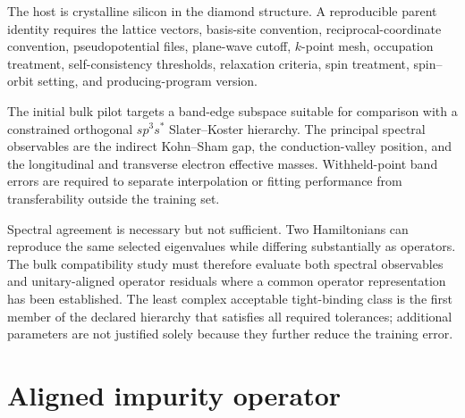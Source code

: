 The host is crystalline silicon in the diamond structure. A reproducible
parent identity requires the lattice vectors, basis-site convention,
reciprocal-coordinate convention, pseudopotential files, plane-wave cutoff,
$k$-point mesh, occupation treatment, self-consistency thresholds, relaxation
criteria, spin treatment, spin--orbit setting, and producing-program version.

The initial bulk pilot targets a band-edge subspace suitable for comparison
with a constrained orthogonal $sp^3s^{\ast}$ Slater--Koster hierarchy. The
principal spectral observables are the indirect Kohn--Sham gap, the
conduction-valley position, and the longitudinal and transverse electron
effective masses. Withheld-point band errors are required to separate
interpolation or fitting performance from transferability outside the training
set.

Spectral agreement is necessary but not sufficient. Two Hamiltonians can
reproduce the same selected eigenvalues while differing substantially as
operators. The bulk compatibility study must therefore evaluate both spectral
observables and unitary-aligned operator residuals where a common operator
representation has been established. The least complex acceptable
tight-binding class is the first member of the declared hierarchy that
satisfies all required tolerances; additional parameters are not justified
solely because they further reduce the training error.


\section{Aligned impurity operator}


